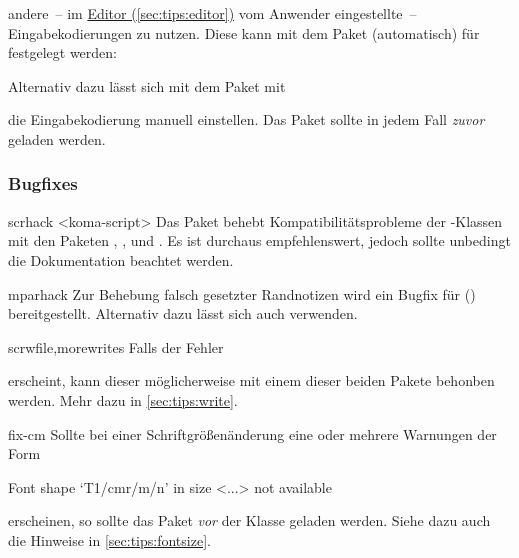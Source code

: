 \begin{packages}
  andere~-- im \hyperref[sec:tips:editor]{Editor (\autoref{sec:tips:editor})} 
  vom Anwender eingestellte~-- Eingabekodierungen zu nutzen. Diese kann mit dem 
  Paket  (automatisch) für  festgelegt werden:
  \begin{Code}
    \usepackage{selinput}
  \end{Code}\vspace{-\baselineskip}%
  Alternativ dazu lässt sich mit dem Paket  mit
  \vspace{-\baselineskip}%
  die Eingabekodierung manuell einstellen. Das Paket  sollte 
  in jedem Fall \emph{zuvor} geladen werden.
\end{packages}


\subsubsection{Bugfixes}
\begin{packages}
\item[scrhack]<koma-script>
  Das Paket behebt Kompatibilitätsprobleme der \KOMAScript-Klassen mit den 
  Paketen , ,  und
  . Es ist durchaus empfehlenswert, jedoch sollte unbedingt 
  die Dokumentation beachtet werden.
\item[mparhack]
  Zur Behebung falsch gesetzter Randnotizen wird ein Bugfix für 
  () bereitgestellt. Alternativ dazu 
  lässt sich auch  verwenden.
\item[scrwfile,morewrites]
  Falls der Fehler 
  \vspace{-\baselineskip}
  erscheint, kann dieser möglicherweise mit einem dieser beiden Pakete behonben 
  werden. Mehr dazu in \autoref{sec:tips:write}.
\item[fix-cm]
  Sollte bei einer Schriftgrößenänderung eine oder mehrere Warnungen der Form
  \begin{Code}
    Font shape `T1/cmr/m/n' in size <...> not available
  \end{Code}\vspace{-\baselineskip}%
  erscheinen, so sollte das Paket  \emph{vor} der Klasse 
  geladen werden. Siehe dazu auch die Hinweise in \autoref{sec:tips:fontsize}.
\end{packages}
